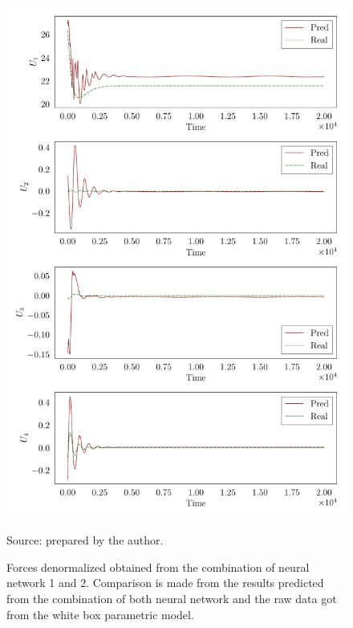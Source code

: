 \begin{figure}[!htb]
    \centering
    \caption[Forces denormalized obtained from the combination of neural network 1 and 2]{Forces denormalized obtained from the combination of neural network 1 and 2. Comparison is made from the results predicted from the combination of both neural network and the raw data got from the white box parametric model.}
    \includegraphics{figures/4results/uav/forces_denormalized.pdf}

    {\footnotesize Source: prepared by the author.}
    \label{fig:forces_denormalized}
\end{figure}



